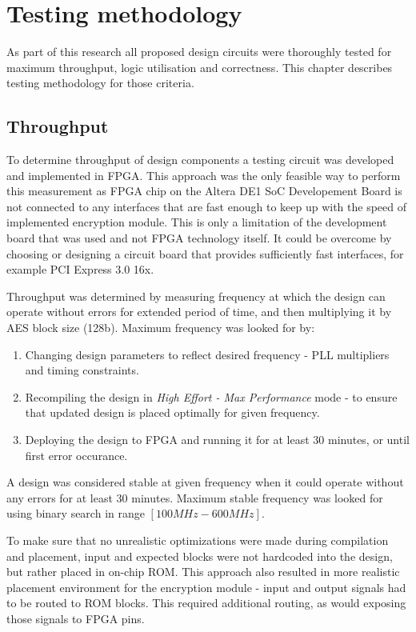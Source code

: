 \section{Testing methodology}
\label{sec:testing-methodology}
As part of this research all proposed design circuits were thoroughly tested for maximum throughput, logic utilisation and correctness. This chapter describes testing methodology for those criteria.


\subsection{Throughput}
To determine throughput of design components a testing circuit was developed and implemented in FPGA. This approach was the only feasible way to perform this measurement as FPGA chip on the Altera DE1 SoC Developement Board is not connected to any interfaces that are fast enough to keep up with the speed of implemented encryption module. This is only a limitation of the development board that was used and not FPGA technology itself. It could be overcome by choosing or designing a circuit board that provides sufficiently fast interfaces, for example PCI Express 3.0 16x.

Throughput was determined by measuring frequency at which the design can operate without errors for extended period of time, and then multiplying it by AES block size (128b). Maximum frequency was looked for by:
\begin{enumerate}[nolistsep]
\item Changing design parameters to reflect desired frequency - PLL multipliers and timing constraints.
\item Recompiling the design in \textit{High Effort - Max Performance} mode - to ensure that updated design is placed optimally for given frequency.
\item Deploying the design to FPGA and running it for at least 30 minutes, or until first error occurance.
\end{enumerate}
A design was considered stable at given frequency when it could operate without any errors for at least 30 minutes. Maximum stable frequency was looked for using binary search in range $[100MHz - 600MHz]$. 

To make sure that no unrealistic optimizations were made during compilation and placement, input and expected blocks were not hardcoded into the design, but rather placed in on-chip ROM. This approach also resulted in more realistic placement environment for the encryption module - input and output signals had to be routed to ROM blocks. This required additional routing, as would exposing those signals to FPGA pins. 

